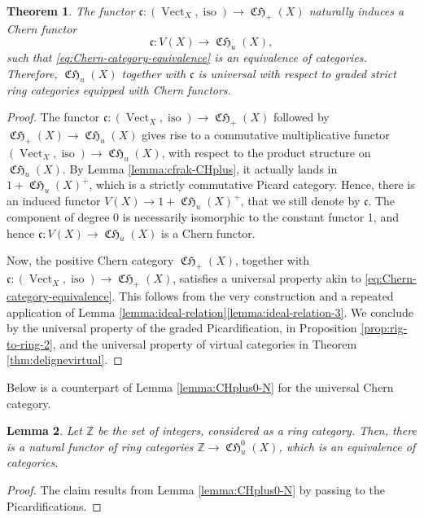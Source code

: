 \documentclass[JEP,XML,SOM,Unicode,published]{cedram}
\theoremstyle{plain}
\newtheorem{theorem}{Theorem}[section]
\newtheorem{lemma}[theorem]{Lemma}
\theoremstyle{definition}
\newcommand{\ZBbb}{\mathbb Z}
\newcommand{\cfrak}{\mathfrak c}
\DeclareMathOperator{\CHfrak}{\mathfrak{CH}}
\DeclareMathOperator{\iso}{iso}
\DeclareMathOperator{\Vect}{Vect}
\begin{document}
\begin{theorem}\label{thm:CH-is-universal}
The functor $\cfrak\colon (\Vect_{X},\iso)\to \CHfrak_{+}(X)$ naturally induces a Chern functor
\begin{displaymath}
\cfrak\colon V(X)\to\CHfrak_{u}(X),
\end{displaymath} such that \eqref{eq:Chern-category-equivalence} is an equivalence of categories. Therefore, $\CHfrak_{u}(X)$ together with $\cfrak$ is universal with respect to graded strict ring categories equipped with Chern functors.
\end{theorem}
\begin{proof}
The functor $\cfrak\colon (\Vect_{X},\iso)\to \CHfrak_{+}(X)$ followed by $\CHfrak_{+}(X)\to\CHfrak_{u}(X)$ gives rise to a commutative multiplicative functor $ (\Vect_{X},\iso)\to \CHfrak_{u}(X)$, with respect to the product structure on $\CHfrak_{u}(X)$. By Lemma \ref{lemma:cfrak-CHplus}, it actually lands in $1+\CHfrak_{u}(X)^{+}$, which is a strictly commutative Picard category. Hence, there is an induced functor $V(X)\to 1+\CHfrak_{u}(X)^{+}$, that we still denote by $\cfrak$. The component of degree 0 is necessarily isomorphic to the constant functor 1, and hence $\cfrak\colon V(X)\to\CHfrak_{u}(X)$ is a Chern functor.

Now, the positive Chern category $\CHfrak_{+}(X)$, together with \hbox{$\cfrak\colon\! (\Vect_{X},\iso)\!\to\!\CHfrak_{+}(X)$}, satisfies a universal property akin to \eqref{eq:Chern-category-equivalence}. This follows from the very construction and a repeated application of Lemma \ref{lemma:ideal-relation}\eqref{lemma:ideal-relation-3}. We conclude by the universal property of the graded Picardification, in Proposition \ref{prop:rig-to-ring-2}, and the universal property of virtual categories in Theorem \ref{thm:delignevirtual}.
\end{proof}

Below is a counterpart of Lemma \ref{lemma:CHplus0-N} for the universal Chern category.
\begin{lemma}\label{lemma:CHu0-Z}
Let $\ZBbb$ be the set of integers, considered as a ring category. Then, there is a natural functor of ring categories $\ZBbb\to\CHfrak_{u}^{0}(X)$, which is an equivalence of categories.
\end{lemma}
\begin{proof}
The claim results from Lemma \ref{lemma:CHplus0-N} by passing to the Picardifications.
\end{proof}
\end{document}
